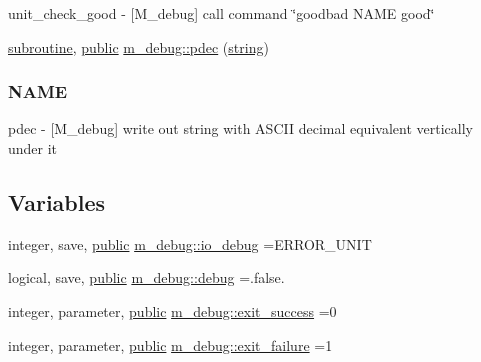 \begin{DoxyCompactItemize}
\begin{DoxyCompactList}
unit\+\_\+check\+\_\+good -\/ \mbox{[}M\+\_\+debug\mbox{]} call command \char`\"{}goodbad N\+A\+M\+E good\char`\"{} \end{DoxyCompactList}\item 
\hyperlink{M__stopwatch_83_8txt_acfbcff50169d691ff02d4a123ed70482}{subroutine}, \hyperlink{M__stopwatch_83_8txt_a2f74811300c361e53b430611a7d1769f}{public} \hyperlink{namespacem__debug_a9b456606b4c555ed2e1e453aa9c872cb}{m\+\_\+debug\+::pdec} (\hyperlink{what__overview_81_8txt_a74cb7e955273b9f9157b4f0c18a38849}{string})
\begin{DoxyCompactList}\small\item\em \subsubsection*{N\+A\+ME}

pdec -\/ \mbox{[}M\+\_\+debug\mbox{]} write out string with A\+S\+C\+II decimal equivalent vertically under it \end{DoxyCompactList}\end{DoxyCompactItemize}
\subsection*{Variables}
\begin{DoxyCompactItemize}
\item 
integer, save, \hyperlink{M__stopwatch_83_8txt_a2f74811300c361e53b430611a7d1769f}{public} \hyperlink{namespacem__debug_ab9d95afd83b30688892f4c818ee8c312}{m\+\_\+debug\+::io\+\_\+debug} =E\+R\+R\+O\+R\+\_\+\+U\+N\+IT
\item 
logical, save, \hyperlink{M__stopwatch_83_8txt_a2f74811300c361e53b430611a7d1769f}{public} \hyperlink{namespacem__debug_aa13827e130b8e8bde8a8597e3d3faa0c}{m\+\_\+debug\+::debug} =.false.
\item 
integer, parameter, \hyperlink{M__stopwatch_83_8txt_a2f74811300c361e53b430611a7d1769f}{public} \hyperlink{namespacem__debug_a9f9aab455ab97238c80d66dd9ed65a7d}{m\+\_\+debug\+::exit\+\_\+success} =0
\item 
integer, parameter, \hyperlink{M__stopwatch_83_8txt_a2f74811300c361e53b430611a7d1769f}{public} \hyperlink{namespacem__debug_a884bfce2d57734eb9f07e8a99d4ffaeb}{m\+\_\+debug\+::exit\+\_\+failure} =1
\end{DoxyCompactItemize}
